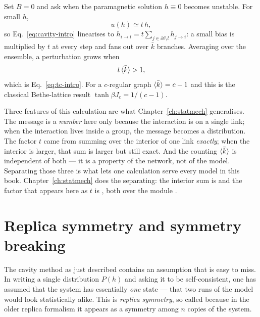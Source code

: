 Set $B=0$ and ask when the paramagnetic solution $h\equiv0$ becomes unstable.
For small $h$,
\[
  u(h)\simeq t\,h,
\]
so Eq.~\eqref{eq:cavity-intro} linearises to
$h_{i\to l}=t\sum_{j\in\partial i\setminus l}h_{j\to i}$: a small bias is
multiplied by $t$ at every step and fans out over $\bar k$ branches. Averaging
over the ensemble, a perturbation grows when
\[
  t\,\langle \bar k \rangle>1,
\]
which is Eq.~\eqref{eq:tc-intro}. For a $c$-regular graph $\langle \bar k \rangle=c-1$ and
this is the classical Bethe-lattice result $\tanh\beta J_{c}=1/(c-1)$.

Three features of this calculation are what Chapter~\ref{ch:statmech}
generalises. The message is a \emph{number} here
only because the interaction is on a single link; when the interaction lives
inside a group, the message becomes a distribution. The factor $t$ came from
summing over the interior of one link \emph{exactly}; when the interior is
larger, that sum is larger but still exact. And the counting $\langle \bar k \rangle$ is
independent of both --- it is a property of the network, not of the model.
Separating those three is what lets one calculation serve every model in this
book. Chapter~\ref{ch:statmech} does the separating: the interior sum is
 and the factor that
appears here as $t$ is , both
over the module .

\section{Replica symmetry and symmetry breaking}
\label{sec:replicas}

The cavity method as just described contains an assumption that is easy to miss.
In writing a single distribution $P(h)$ and asking it to be self-consistent, one
has assumed that the system has essentially \emph{one} state --- that two runs
of the model would look statistically alike. This is
\emph{replica symmetry}, so called because in the older replica formalism
\citep{mezard1987} it appears as a symmetry among $n$ copies of the system.

